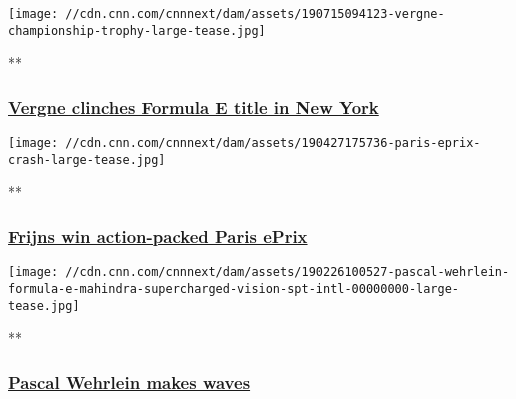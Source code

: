 \href{/videos/sports/2019/07/15/formula-e-new-york-e-prix-jean-eric-vergne-spt-intl.cnn}{}

\texttt{[image: //cdn.cnn.com/cnnnext/dam/assets/190715094123-vergne-championship-trophy-large-tease.jpg]}

**

\hypertarget{vergne-clinches-formula-e-title-in-new-york}{%
\subsubsection{\texorpdfstring{\href{/videos/sports/2019/07/15/formula-e-new-york-e-prix-jean-eric-vergne-spt-intl.cnn}{Vergne
clinches Formula E title in New
York}}{Vergne clinches Formula E title in New York}}\label{vergne-clinches-formula-e-title-in-new-york}}

\href{/videos/sports/2019/05/06/paris-e-prix-highlights-robin-frijns-formula-e-spt-intl.cnn}{}

\texttt{[image: //cdn.cnn.com/cnnnext/dam/assets/190427175736-paris-eprix-crash-large-tease.jpg]}

**

\hypertarget{frijns-win-action-packed-paris-eprix}{%
\subsubsection{\texorpdfstring{\href{/videos/sports/2019/05/06/paris-e-prix-highlights-robin-frijns-formula-e-spt-intl.cnn}{Frijns
win action-packed Paris
ePrix}}{Frijns win action-packed Paris ePrix}}\label{frijns-win-action-packed-paris-eprix}}

\href{/videos/tv/2019/02/25/pascal-wehrlein-formula-e-mahindra-supercharged-vision-spt-intl.cnn}{}

\texttt{[image: //cdn.cnn.com/cnnnext/dam/assets/190226100527-pascal-wehrlein-formula-e-mahindra-supercharged-vision-spt-intl-00000000-large-tease.jpg]}

**

\hypertarget{pascal-wehrlein-makes-waves}{%
\subsubsection{\texorpdfstring{\href{/videos/tv/2019/02/25/pascal-wehrlein-formula-e-mahindra-supercharged-vision-spt-intl.cnn}{Pascal
Wehrlein makes
waves}}{Pascal Wehrlein makes waves}}\label{pascal-wehrlein-makes-waves}}

\href{/videos/sports/2019/01/31/alejandro-agag-extreme-e-formula-e-fia-electric-racing-supercharged-spt-intl.cnn}{}

